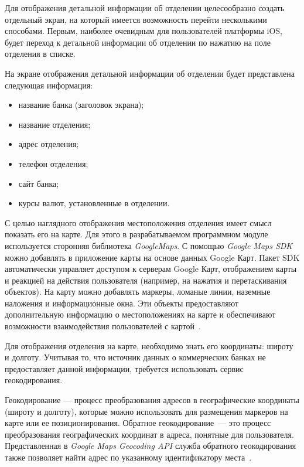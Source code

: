 \pagebreak

Для отображения детальной информации об отделении целесообразно создать отдельный
экран, на который имеется возможность перейти несколькими способами. Первым,
наиболее очевидным для пользователей платформы iOS, будет переход к детальной
информации об отделении по нажатию на поле отделения в списке.

На экране отображения детальной информации об отделении будет представлена
следующая информация:
\begin{itemize}
  \item название банка (заголовок экрана);
  \item название отделения;
  \item адрес отделения;
  \item телефон отделения;
  \item сайт банка;
  \item курсы валют, установленные в отделении.
\end{itemize}

С целью наглядного отображения местоположения отделения имеет смысл показать
его на карте. Для этого в разрабатываемом программном модуле используется
сторонняя библиотека \textit{GoogleMaps}. С помощью \textit{Google Maps SDK}
можно добавлять в приложение карты на основе данных Google Карт.
Пакет SDK автоматически управляет доступом к серверам Google Карт,
отображением карты и реакцией на действия пользователя (например, на нажатия
и перетаскивания объектов). На карту можно добавлять маркеры,
ломаные линии, наземные наложения и информационные окна. Эти объекты
предоставляют дополнительную информацию о местоположениях на карте и
обеспечивают возможности взаимодействия пользователей с
картой~\cite{google_maps_ios}.

Для отображения отделения на карте, необходимо знать его координаты:
широту и долготу. Учитывая то, что источник данных о коммерческих
банках не предоставляет данной информации, требуется использовать сервис геокодирования.

Геокодирование --- процесс преобразования адресов в географические
координаты (широту и долготу), которые можно использовать для размещения
маркеров на карте или ее позиционирования.
Обратное геокодирование~--- это процесс преобразования географических координат
в адреса, понятные для пользователя. Представленная в \textit{Google Maps Geocoding API}
служба обратного геокодирования также позволяет найти адрес по указанному
идентификатору места~\cite{google_geocoding}.

